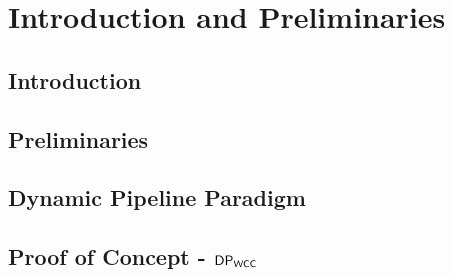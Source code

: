 \chapter{Introduction and Preliminaries}
\section{Introduction}
\section{Preliminaries}
\section{Dynamic Pipeline Paradigm}
\section{Proof of Concept - $\mathsf{DP_{WCC}}$}

